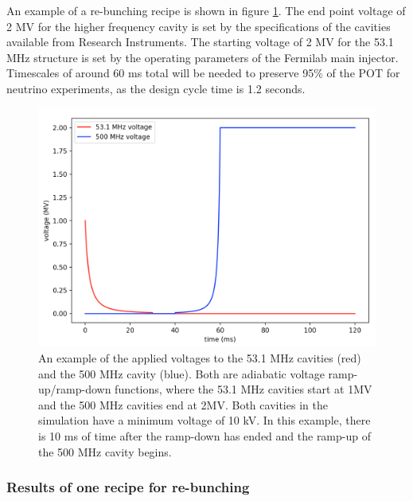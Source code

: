 An example of a re-bunching recipe is shown in figure
\ref{fig:transition_voltages}. The end point voltage of 2 MV for the
higher frequency cavity is set by the specifications of the cavities
available from Research Instruments. The starting voltage of 2 MV for
the 53.1 MHz structure is set by the operating parameters of the
Fermilab main injector. Timescales of around 60 ms total will be
needed to preserve 95\% of the POT for neutrino experiments, as the design cycle time is 1.2 seconds.


\begin{figure}[h!]
	\begin{center}
        \includegraphics[width=0.60\linewidth]{Figures/transition_voltages.png}
	\end{center}
	\caption{An example of the applied voltages to the 53.1 MHz
          cavities (red) and the 500 MHz cavity (blue). Both are adiabatic voltage
          ramp-up/ramp-down functions, where the 53.1 MHz cavities start at 1MV and
          the 500 MHz cavities end at 2MV. Both cavities in the simulation have a minimum
          voltage of 10 kV. In this example, there is 10 ms of time after the ramp-down has
          ended and the ramp-up of the 500 MHz cavity begins.}
		\label{fig:transition_voltages}
\end{figure}

\subsubsection{Results of one recipe for re-bunching}

